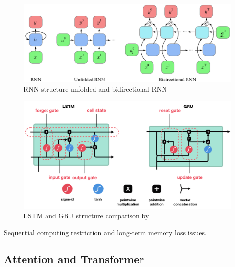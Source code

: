 \begin{figure}[ht!]
    \centering
    \includegraphics[width=\textwidth]{literature/imgs/2-RNN-unfold.pdf}
    \caption{RNN structure unfolded and bidirectional RNN}
    \label{fig:2-RNN-unfold}
\end{figure}

\citet{hochreiter1997long}

\citet{sherstinsky2020fundamentals}

\citet{chung2014empirical}

\begin{figure}[ht!]
    \centering
    \includegraphics[width=.9\textwidth]{literature/imgs/ext-LSTM-GRU.png}
    \caption{LSTM and GRU structure comparison by \citet{phi2018illustrated}}
    \label{fig:ext-LSTM-GRU}
\end{figure}

Sequential computing restriction and long-term memory loss issues.

\subsection{Attention and Transformer} %
\citet{bahdanau2016neural}

